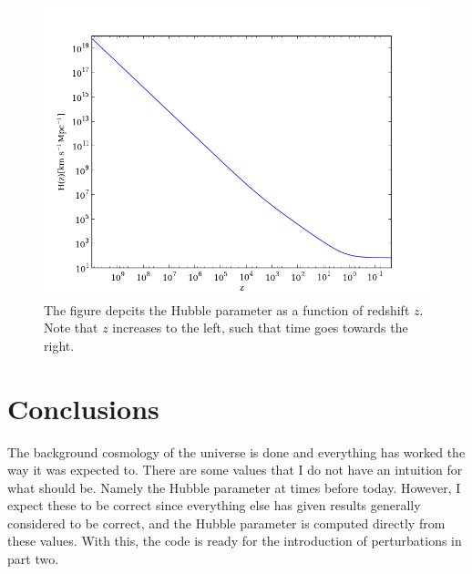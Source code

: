 \documentclass{aa}   %
\begin{document}
 \begin{figure}[ht]
  \includegraphics[width=.49\textwidth]{figure_3.png}
  \caption{The figure depcits the Hubble parameter as a function of redshift $z$. Note that $z$ increases to the left, such that time goes towards the right.}
 \label{figure3}
 \end{figure}
% 

\section{Conclusions} \label{sec:conclusions}
The background cosmology of the universe is done and everything has worked the way it was expected to.
There are some values that I do not have an intuition for what should be. Namely the Hubble parameter at times before today. However, I expect these to be correct since everything else has given results generally considered to be correct, and the Hubble parameter is computed directly from these values.
With this, the code is ready for the introduction of perturbations in part two. 

\end{document}
